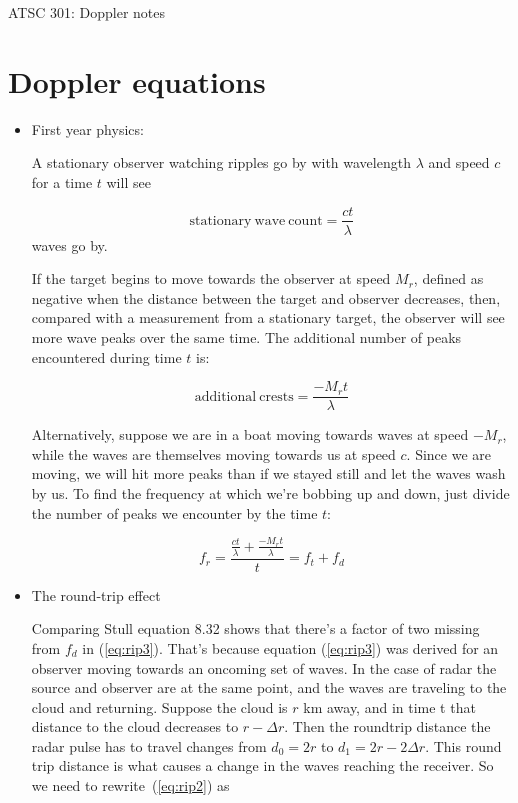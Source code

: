 \documentclass[12pt]{article}
\begin{document}
\pagestyle{first}

\begin{center}
ATSC 301:  Doppler notes\\
\end{center}


\noindent

\section{Doppler equations}
\label{sec:changes}


\begin{itemize}
\item First year physics:
\par
A stationary observer watching ripples go by with wavelength $\lambda$
and speed $c$ for a time $t$ will see

\begin{equation}
  \label{eq:rip1}
\mathrm{stationary\ wave\ count}=\frac{ c t}{\lambda}
\end{equation}
waves go by.

If the target begins to move towards the observer at speed $M_r$,
defined as negative when the distance between the target and observer
decreases,
then, compared with a measurement from a stationary target,
the observer will see more wave peaks over the same time.  The
additional number of peaks encountered during time $t$ is:

\begin{equation}
  \label{eq:rip2}
  \mathrm{additional\ crests}=\frac{ -M_r t }{\lambda}
\end{equation}

Alternatively, suppose we are in a boat moving towards  waves at speed $-M_r$,
while the waves are themselves moving towards us at speed $c$.
Since we are moving, we will hit more peaks than if we stayed still and
let the waves wash by us.  To find the frequency at which we're bobbing
up and down, just divide the number of peaks we encounter
by the time $t$:

\begin{equation}
  \label{eq:rip3}
  f_r = \frac{\frac{ct }{\lambda} + \frac{-M_r t }{\lambda} }{t} = f_t + f_{d}
\end{equation}



\item The round-trip effect
\par
Comparing  Stull equation 8.32 shows that there's a factor
of two missing from $f_d$ in (\ref{eq:rip3}).  That's because equation
(\ref{eq:rip3}) was derived for an observer moving towards an
oncoming set of waves.  In the case of radar the source and observer are at the
same point, and the waves are traveling to the cloud and returning.  Suppose
the cloud is $r$ km away, and in time t that 
distance to the cloud decreases  to $r - \Delta r$.  Then the roundtrip distance the
radar pulse has to travel changes from $d_0 = 2r$ to
$d_1=2r - 2 \Delta r$.  This round trip distance is what
causes a change in the waves reaching the receiver. So we need
to rewrite~(\ref{eq:rip2}) as


\end{itemize}
\end{document}
